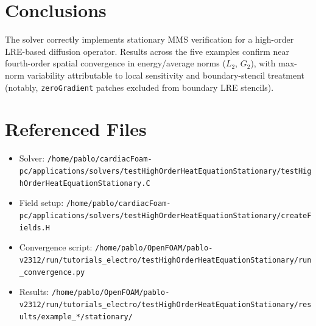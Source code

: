 \documentclass[11pt,a4paper]{article}
\begin{document}
\section{Conclusions}
The solver correctly implements stationary MMS verification for a high-order LRE-based diffusion operator. Results across the five examples confirm near fourth-order spatial convergence in energy/average norms ($L_2$, $G_2$), with max-norm variability attributable to local sensitivity and boundary-stencil treatment (notably, \texttt{zeroGradient} patches excluded from boundary LRE stencils).

\section*{Referenced Files}
\begin{itemize}
\item Solver: \texttt{/home/pablo/cardiacFoam-pc/applications/solvers/testHighOrderHeatEquationStationary/testHighOrderHeatEquationStationary.C}
\item Field setup: \texttt{/home/pablo/cardiacFoam-pc/applications/solvers/testHighOrderHeatEquationStationary/createFields.H}
\item Convergence script: \texttt{/home/pablo/OpenFOAM/pablo-v2312/run/tutorials\_electro/testHighOrderHeatEquationStationary/run\_convergence.py}
\item Results: \texttt{/home/pablo/OpenFOAM/pablo-v2312/run/tutorials\_electro/testHighOrderHeatEquationStationary/results/example\_*/stationary/}
\end{itemize}
\end{document}
